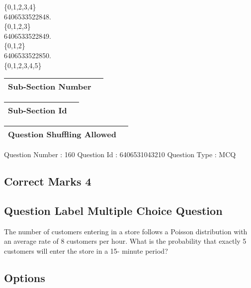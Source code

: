 \documentclass{article}
\begin{document}
\{0,1,2,3,4\}\\

6406533522848.\\

\{0,1,2,3\}\\

6406533522849.\\

\{0,1,2\}\\

6406533522850.\\

\{0,1,2,3,4,5\}\\

\begin{longtable}{|c|c|}
\hline
\textbf{Sub-Section Number} & \textbf{} \\ \hline
\end{longtable}

\begin{longtable}{|c|c|}
\hline
\textbf{Sub-Section Id} & \textbf{} \\ \hline
\end{longtable}

\begin{longtable}{|c|c|}
\hline
\textbf{Question Shuffling Allowed} & \textbf{} \\ \hline
\end{longtable}

Question Number : 160 Question Id : 6406531043210 Question Type : MCQ\\

\subsection{Correct Marks  4}

\subsection{Question Label  Multiple Choice Question}

The number of customers entering in a store follows a Poisson distribution with an average rate of 
8 customers per hour. What is the probability that exactly 5 customers will enter the store in a 15-
minute period?\\

\subsection{Options }
\end{document}
